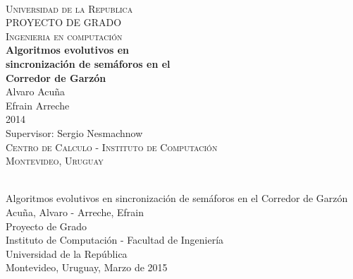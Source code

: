\begin{titlepage}
  \thispagestyle{empty}
  \begin{center}
    ~\\[2.2cm]



    \textsc{\Huge Universidad de la Republica } \\[2.5cm]
    \textsc{\Huge PROYECTO DE GRADO } \\[0.5cm]
    \textsc{\Huge Ingenieria en computación } \\[2.5cm]    
    \textbf{\Huge Algoritmos evolutivos en } \\[0.2cm]
    \textbf{\Huge sincronización de semáforos en el } \\[0.3cm]
    \textbf{\Huge Corredor de Garzón } \\[1.5cm]    
    
    {\huge Alvaro Acuña} \\[0.2cm]
    {\huge Efrain Arreche} \\[0.2cm]
    {\Large 2014} \\[2.0cm]
    {\Large Supervisor: Sergio Nesmachnow} \\[1.0cm]

    \textsc{\large Centro de Calculo - Instituto de Computación} \\[0.2cm]
    \textsc{\large Montevideo, Uruguay} \\[1.5cm]

  \end{center}
  \vfill
\end{titlepage}
{
  \thispagestyle{empty}
  ~\\[16cm]
  Algoritmos evolutivos en sincronización de semáforos en el Corredor de Garzón \\[0.05cm]
  Acuña, Alvaro - Arreche, Efrain \\[0.05cm]
  Proyecto de Grado \\[0.05cm]
  Instituto de Computación - Facultad de Ingeniería \\[0.05cm]
  Universidad de la República \\[0.05cm]
  Montevideo, Uruguay, Marzo de 2015 \\[0.05cm]
  \vfill
  \cleardoublepage
}
\setcounter{page}{1}